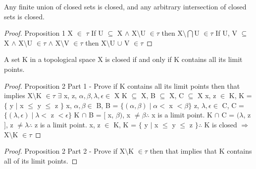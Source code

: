\documentclass{article}
\begin{document}
  \begin{proposition}
      Any finite union of closed sets is closed, and any arbitrary intersection of closed sets is closed.
  \end{proposition}

  \begin{proof}
  	Proposition 1
  	\newline
	X $\in$ $\tau$
	\newline
	If U $\subseteq$ X $\wedge$ X$\setminus$U $\in \tau$ then X$\setminus\bigcap$U $\in \tau$
	\newline
	If U, V $\subseteq$ X $\wedge$ X$\setminus$U $\in \tau$  $\wedge$ X$\setminus$V $\in \tau$ then X$\setminus$U $\cup$ V $\in \tau$
  \end{proof}



	\begin{proposition}
		A set K in a topological space X is closed if and only if K contains all its limit points.
	\end{proposition}
	\begin{proof}
		Proposition 2 Part 1 - Prove if K contains all its limit points then that implies X$\setminus$K $\in \tau$
		\newline
		$\exists$ x, z, $\alpha, \beta, \lambda, \epsilon \in$ X
		\newline
		K $\subseteq$ X, B $\subseteq$ X, C $\subseteq$ X
		\newline
		x, z $\in$ K, K = $\lbrace$ y $\mid$ x $\leq$ y $\leq$ z $\rbrace$
		\newline
		x, $\alpha, \beta \in$ B, B = $\lbrace \left( \alpha, \beta \right) \mid \alpha <$ x $< \beta  \rbrace$
		\newline
		z, $\lambda, \epsilon \in$ C, C = $\lbrace \left( \lambda, \epsilon \right) \mid \lambda <$ z $< \epsilon \rbrace$
		\newline
		K $\cap$ B = $[$ x, $\beta  )$, x $\neq \beta \therefore$ x is a limit point.
		\newline
		K $\cap$ C = $( \lambda$, z $]$, z $\neq \lambda \therefore$ z is a limit point.
		\newline
		x, z $\in$ K, K = $\lbrace$ y $\mid$ x $\leq$ y $\leq$ z $\rbrace \therefore$ K is closed $\Rightarrow$ X$\setminus$K $\in \tau$
		\newline
	\end{proof}
	\begin{proof}
	Proposition 2 Part 2 - Prove if X$\setminus$K $\in \tau$ then that implies that K contains all of its limit points.
	\end{proof}
\end{document}
